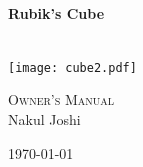 \begin{titlepage}
\begin{center}


\HRule \\[0.4cm]
{ \huge \bfseries Rubik's Cube \\[0.4cm] }
\HRule \\[0.5cm]
\begin{center}
\texttt{[image: cube2.pdf]}~
\end{center}
\textsc{\LARGE  Owner's Manual}\\[1.5cm]




Nakul Joshi

\vfill

{\large \today}

\end{center}
\end{titlepage}